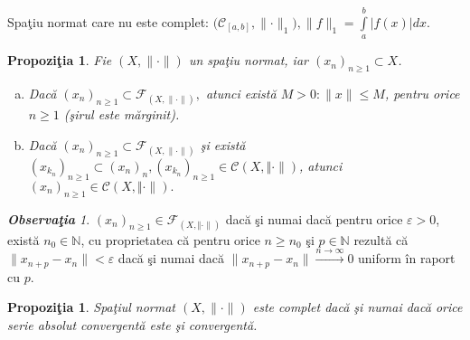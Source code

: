 \documentclass[ a4paper, 12pt]{report}
\newtheorem{prop}[theorem]{\bf Propozi\c tia }
\theoremstyle{definition}
\theoremstyle{remark}
\newtheorem{obs}{\bf Observa\c tia }[section]
\numberwithin{equation}{section}
\begin{document}
Spa\c tiu normat care nu este complet:
$\Big(\mathcal{C}_{[a,b]}, \lVert \cdot \rVert_{1} \Big), \lVert f \rVert_{1} = \int\limits_{a}^{b}\lvert f(x) \rvert dx$.
\begin{prop}\label{apa}
Fie $(X, \lVert \cdot \rVert)$ un spa\c tiu normat, iar $(x_n)_{n \geq 1} \subset X$.
\begin{enumerate}[(a)]
\item Dac\u a $(x_n)_{n \geq 1} \subset \mathcal{F}_{(X, \lVert \cdot \rVert)},$ atunci  exist\u a $M>0 : \lVert x \rVert \leq M$, pentru orice $n \geq 1$ (\c sirul este m\u arginit).
\item Dac\u a  $(x_n)_{n \geq 1} \subset \mathcal{F}_{(X, \lVert \cdot \rVert)}$ \c si  exist\u a $(x_{k_n})_{n \geq 1} \subset (x_n)_n,(x_{k_n})_{n \geq 1} \in \mathcal{C}{(X, \Vert \cdot \rVert)}$, atunci $(x_n)_{n \geq 1} \in \mathcal{C}{(X, \Vert \cdot \rVert)}.$
\end{enumerate}
\end{prop}
\begin{obs}
$(x_n)_{n \geq 1} \in \mathcal{F}_{(X, \Vert \cdot \rVert)}$ dac\u a \c si numai dac\u a pentru orice $\varepsilon>0$, exist\u a $n_0 \in \mathbb{N}$, cu proprietatea c\u a pentru orice $n \geq n_0$ \c si $p \in \mathbb{N}$ rezult\u a c\u a $\lVert x_{n+p} - x_n \rVert < \varepsilon$ dac\u a \c si numai dac\u a $\lVert x_{n+p} - x_n \rVert \stackrel{n \rightarrow \infty}{\longrightarrow} 0$ uniform \^in raport cu $p$.
\end{obs}
\begin{prop}
Spa\c tiul normat $(X,\lVert \cdot \rVert)$ este complet dac\u a \c si numai dac\u a orice serie absolut convergent\u a este \c si convergent\u a.
\end{prop}
\end{document}
